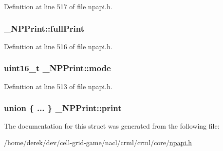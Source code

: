 Definition at line 517 of file npapi.h.

\hypertarget{struct___n_p_print_a115d1a36b9d19039a25689290949f654}{
\subsubsection[{fullPrint}]{ {\bf \_\-NPPrint::fullPrint}}}
\label{struct___n_p_print_a115d1a36b9d19039a25689290949f654}


Definition at line 516 of file npapi.h.

\hypertarget{struct___n_p_print_ab35f85800a5a202edecad010baaf7a54}{
\subsubsection[{mode}]{\setlength{\rightskip}{0pt plus 5cm}uint16\_\-t {\bf \_\-NPPrint::mode}}}
\label{struct___n_p_print_ab35f85800a5a202edecad010baaf7a54}


Definition at line 513 of file npapi.h.

\hypertarget{struct___n_p_print_a3b01da2a510ff500419839fd0dcbe51a}{
\subsubsection[{print}]{\setlength{\rightskip}{0pt plus 5cm}union \{ ... \}   {\bf \_\-NPPrint::print}}}
\label{struct___n_p_print_a3b01da2a510ff500419839fd0dcbe51a}


The documentation for this struct was generated from the following file:\begin{DoxyCompactItemize}
\item 
/home/derek/dev/cell-\/grid-\/game/nacl/crml/crml/core/\hyperlink{npapi_8h}{npapi.h}\end{DoxyCompactItemize}
